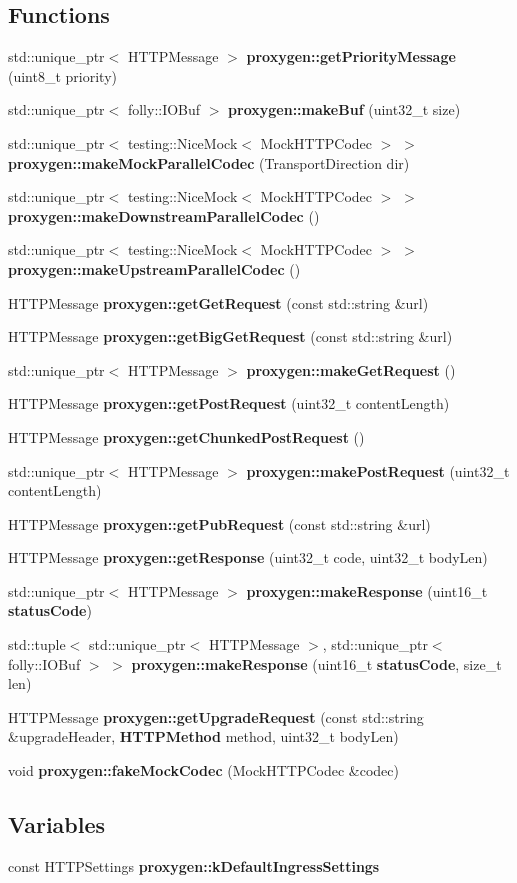 \subsection*{Functions}
\begin{DoxyCompactItemize}
\item 
std\+::unique\+\_\+ptr$<$ H\+T\+T\+P\+Message $>$ {\bf proxygen\+::get\+Priority\+Message} (uint8\+\_\+t priority)
\item 
std\+::unique\+\_\+ptr$<$ folly\+::\+I\+O\+Buf $>$ {\bf proxygen\+::make\+Buf} (uint32\+\_\+t size)
\item 
std\+::unique\+\_\+ptr$<$ testing\+::\+Nice\+Mock$<$ Mock\+H\+T\+T\+P\+Codec $>$ $>$ {\bf proxygen\+::make\+Mock\+Parallel\+Codec} (Transport\+Direction dir)
\item 
std\+::unique\+\_\+ptr$<$ testing\+::\+Nice\+Mock$<$ Mock\+H\+T\+T\+P\+Codec $>$ $>$ {\bf proxygen\+::make\+Downstream\+Parallel\+Codec} ()
\item 
std\+::unique\+\_\+ptr$<$ testing\+::\+Nice\+Mock$<$ Mock\+H\+T\+T\+P\+Codec $>$ $>$ {\bf proxygen\+::make\+Upstream\+Parallel\+Codec} ()
\item 
H\+T\+T\+P\+Message {\bf proxygen\+::get\+Get\+Request} (const std\+::string \&url)
\item 
H\+T\+T\+P\+Message {\bf proxygen\+::get\+Big\+Get\+Request} (const std\+::string \&url)
\item 
std\+::unique\+\_\+ptr$<$ H\+T\+T\+P\+Message $>$ {\bf proxygen\+::make\+Get\+Request} ()
\item 
H\+T\+T\+P\+Message {\bf proxygen\+::get\+Post\+Request} (uint32\+\_\+t content\+Length)
\item 
H\+T\+T\+P\+Message {\bf proxygen\+::get\+Chunked\+Post\+Request} ()
\item 
std\+::unique\+\_\+ptr$<$ H\+T\+T\+P\+Message $>$ {\bf proxygen\+::make\+Post\+Request} (uint32\+\_\+t content\+Length)
\item 
H\+T\+T\+P\+Message {\bf proxygen\+::get\+Pub\+Request} (const std\+::string \&url)
\item 
H\+T\+T\+P\+Message {\bf proxygen\+::get\+Response} (uint32\+\_\+t code, uint32\+\_\+t body\+Len)
\item 
std\+::unique\+\_\+ptr$<$ H\+T\+T\+P\+Message $>$ {\bf proxygen\+::make\+Response} (uint16\+\_\+t {\bf status\+Code})
\item 
std\+::tuple$<$ std\+::unique\+\_\+ptr$<$ H\+T\+T\+P\+Message $>$, std\+::unique\+\_\+ptr$<$ folly\+::\+I\+O\+Buf $>$ $>$ {\bf proxygen\+::make\+Response} (uint16\+\_\+t {\bf status\+Code}, size\+\_\+t len)
\item 
H\+T\+T\+P\+Message {\bf proxygen\+::get\+Upgrade\+Request} (const std\+::string \&upgrade\+Header, {\bf H\+T\+T\+P\+Method} method, uint32\+\_\+t body\+Len)
\item 
void {\bf proxygen\+::fake\+Mock\+Codec} (Mock\+H\+T\+T\+P\+Codec \&codec)
\end{DoxyCompactItemize}
\subsection*{Variables}
\begin{DoxyCompactItemize}
\item 
const H\+T\+T\+P\+Settings {\bf proxygen\+::k\+Default\+Ingress\+Settings}
\end{DoxyCompactItemize}
